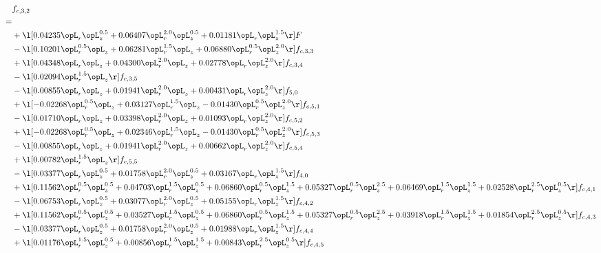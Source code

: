 \begin{alignat}{2} 
\label{eq:f_32_2} 
& f_{c,3,2} \nonumber \\ 
 = \\ 
& + \l[  0.04235 \opL_r \opL_z^{0.5} +  0.06407 \opL_r^{2.0} \opL_z^{0.5} +  0.01181 \opL_r \opL_z^{1.5}  \r] F \nonumber \\ 
& - \l[  0.10201 \opL_r^{0.5} \opL_z +  0.06281 \opL_r^{1.5} \opL_z +  0.06880 \opL_r^{0.5} \opL_z^{2.0}  \r] f_{c,3,3} \nonumber \\ 
& + \l[  0.04348 \opL_r \opL_z +  0.04300 \opL_r^{2.0} \opL_z +  0.02778 \opL_r \opL_z^{2.0}  \r] f_{c,3,4} \nonumber \\ 
& - \l[  0.02094 \opL_r^{1.5} \opL_z  \r] f_{c,3,5} \nonumber \\ 
& - \l[  0.00855 \opL_r \opL_z +  0.01941 \opL_r^{2.0} \opL_z +  0.00431 \opL_r \opL_z^{2.0}  \r] f_{5,0} \nonumber \\ 
& + \l[  -0.02268 \opL_r^{0.5} \opL_z +  0.03127 \opL_r^{1.5} \opL_z   -0.01430 \opL_r^{0.5} \opL_z^{2.0}  \r] f_{c,5,1} \nonumber \\ 
& - \l[  0.01710 \opL_r \opL_z +  0.03398 \opL_r^{2.0} \opL_z +  0.01093 \opL_r \opL_z^{2.0}  \r] f_{c,5,2} \nonumber \\ 
& + \l[  -0.02268 \opL_r^{0.5} \opL_z +  0.02346 \opL_r^{1.5} \opL_z   -0.01430 \opL_r^{0.5} \opL_z^{2.0}  \r] f_{c,5,3} \nonumber \\ 
& - \l[  0.00855 \opL_r \opL_z +  0.01941 \opL_r^{2.0} \opL_z +  0.00662 \opL_r \opL_z^{2.0}  \r] f_{c,5,4} \nonumber \\ 
& + \l[  0.00782 \opL_r^{1.5} \opL_z  \r] f_{c,5,5} \nonumber \\ 
& - \l[  0.03377 \opL_r \opL_z^{0.5} +  0.01758 \opL_r^{2.0} \opL_z^{0.5} +  0.03167 \opL_r \opL_z^{1.5}  \r] f_{4,0} \nonumber \\ 
& + \l[  0.11562 \opL_r^{0.5} \opL_z^{0.5} +  0.04703 \opL_r^{1.5} \opL_z^{0.5} +  0.06860 \opL_r^{0.5} \opL_z^{1.5} +  0.05327 \opL_r^{0.5} \opL_z^{2.5} +  0.06469 \opL_r^{1.5} \opL_z^{1.5} +  0.02528 \opL_r^{2.5} \opL_z^{0.5}  \r] f_{c,4,1} \nonumber \\ 
& - \l[  0.06753 \opL_r \opL_z^{0.5} +  0.03077 \opL_r^{2.0} \opL_z^{0.5} +  0.05155 \opL_r \opL_z^{1.5}  \r] f_{c,4,2} \nonumber \\ 
& + \l[  0.11562 \opL_r^{0.5} \opL_z^{0.5} +  0.03527 \opL_r^{1.5} \opL_z^{0.5} +  0.06860 \opL_r^{0.5} \opL_z^{1.5} +  0.05327 \opL_r^{0.5} \opL_z^{2.5} +  0.03918 \opL_r^{1.5} \opL_z^{1.5} +  0.01854 \opL_r^{2.5} \opL_z^{0.5}  \r] f_{c,4,3} \nonumber \\ 
& - \l[  0.03377 \opL_r \opL_z^{0.5} +  0.01758 \opL_r^{2.0} \opL_z^{0.5} +  0.01988 \opL_r \opL_z^{1.5}  \r] f_{c,4,4} \nonumber \\ 
& + \l[  0.01176 \opL_r^{1.5} \opL_z^{0.5} +  0.00856 \opL_r^{1.5} \opL_z^{1.5} +  0.00843 \opL_r^{2.5} \opL_z^{0.5}  \r] f_{c,4,5} \nonumber \\ 
\end{alignat} 


